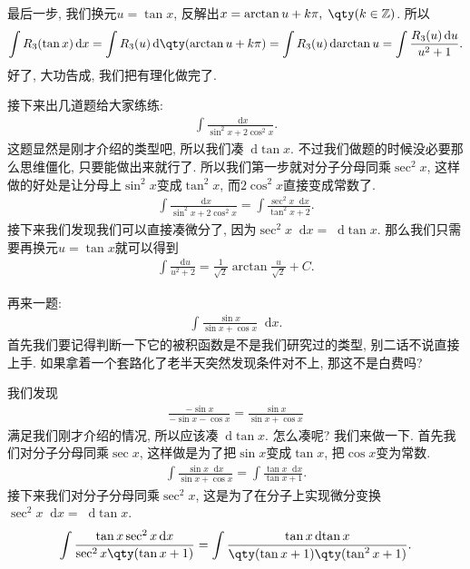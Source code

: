 \documentclass{ctexbook}
\newcommand*{\dif}{\mathop{}\!\mathrm{d}}
\begin{document}
{最后一步, 我们换元$u=\tan{x}$, 反解出$x=\arctan{u}+k\pi,\;\qty(k\in\mathbb{Z})$. 所以
\begin{align*}
\int R_{3}(\tan{x})\dif{x}=\int R_{3}(u)\dif{\qty(\arctan{u}+k\pi)}=\int R_{3}(u)\dif{\arctan{u}}=\int\frac{R_{3}(u)\dif{u}}{u^{2}+1}
.\end{align*}
好了, 大功告成, 我们把有理化做完了. \par
接下来出几道题给大家练练: 
\begin{align*}
\int\frac{\dif{x}}{\sin^{2}{x}+2\cos^{2}{x}}
.\end{align*}
这题显然是刚才介绍的类型吧, 所以我们凑$\dif{\tan{x}}$. 不过我们做题的时候没必要那么思维僵化, 只要能做出来就行了. 所以我们第一步就对分子分母同乘$\sec^{2}{x}$, 这样做的好处是让分母上$\sin^{2}{x}$变成$\tan^{2}{x}$, 而$2\cos^{2}{x}$直接变成常数了. 
\begin{align*}
\int\frac{\dif{x}}{\sin^{2}{x}+2\cos^{2}{x}}=\int\frac{\sec^{2}{x}\dif{x}}{\tan^{2}{x}+2}
.\end{align*}
接下来我们发现我们可以直接凑微分了, 因为$\sec^{2}{x}\dif{x}=\dif{\tan{x}}$. 那么我们只需要再换元$u=\tan{x}$就可以得到
\begin{align*}
\int\frac{\dif{u}}{u^{2}+2}=\frac{1}{\sqrt{2}}\arctan{\frac{u}{\sqrt{2}}}+C
.\end{align*}\par
再来一题: 
\begin{align*}
\int\frac{\sin{x}}{\sin{x}+\cos{x}}\dif{x}
.\end{align*}
首先我们要记得判断一下它的被积函数是不是我们研究过的类型, 别二话不说直接上手. 如果拿着一个套路化了老半天突然发现条件对不上, 那这不是白费吗? \par
我们发现
\begin{align*}
\frac{-\sin{x}}{-\sin{x}-\cos{x}}=\frac{\sin{x}}{\sin{x}+\cos{x}}
\end{align*}
满足我们刚才介绍的情况, 所以应该凑$\dif{\tan{x}}$. 怎么凑呢? 我们来做一下. 首先我们对分子分母同乘$\sec{x}$, 这样做是为了把$\sin{x}$变成$\tan{x}$, 把$\cos{x}$变为常数. 
\begin{align*}
\int\frac{\sin{x}\dif{x}}{\sin{x}+\cos{x}}=\int\frac{\tan{x}\dif{x}}{\tan{x}+1}
.\end{align*}
接下来我们对分子分母同乘$\sec^{2}{x}$, 这是为了在分子上实现微分变换$\sec^{2}{x}\dif{x}=\dif{\tan{x}}$. 
\begin{align*}
\int\frac{\tan{x}\sec^{2}{x}\dif{x}}{\sec^{2}{x}\qty(\tan{x}+1)}=\int\frac{\tan{x}\dif{\tan{x}}}{\qty(\tan{x}+1)\qty(\tan^{2}{x}+1)}
.\end{align*}
}
\end{document}
